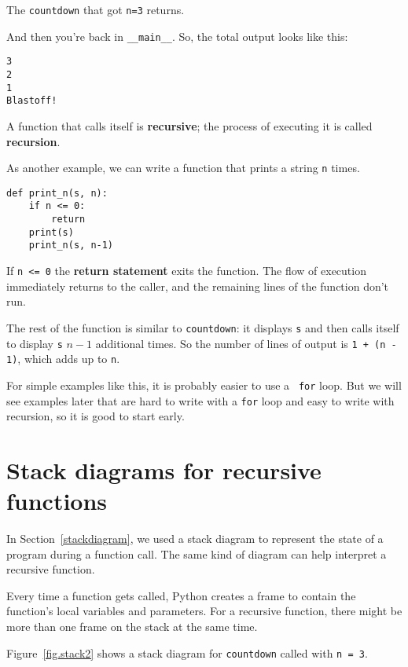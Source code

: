 The {\tt countdown} that got {\tt n=3} returns.

And then you're back in \verb"__main__".  So, the
total output looks like this:

\begin{verbatim}
3
2
1
Blastoff!
\end{verbatim}
%
A function that calls itself is {\bf recursive}; the process of
executing it is called {\bf recursion}.

As another example, we can write a function that prints a
string {\tt n} times.

\begin{verbatim}
def print_n(s, n):
    if n <= 0:
        return
    print(s)
    print_n(s, n-1)
\end{verbatim}
%
If {\tt n <= 0} the {\bf return statement} exits the function.  The
flow of execution immediately returns to the caller, and the remaining
lines of the function don't run.

The rest of the function is similar to {\tt countdown}: it displays
{\tt s} and then calls itself to display {\tt s} $n-1$ additional
times.  So the number of lines of output is {\tt 1 + (n - 1)}, which
adds up to {\tt n}.

For simple examples like this, it is probably easier to use a {\tt
for} loop.  But we will see examples later that are hard to write
with a {\tt for} loop and easy to write with recursion, so it is
good to start early.


\section{Stack diagrams for recursive functions}
\label{recursive.stack}

In Section~\ref{stackdiagram}, we used a stack diagram to represent
the state of a program during a function call.  The same kind of
diagram can help interpret a recursive function.

Every time a function gets called, Python creates a
frame to contain the function's local variables and parameters.
For a recursive function, there might be more than one frame on the
stack at the same time.

Figure~\ref{fig.stack2} shows a stack diagram for {\tt countdown} called with
{\tt n = 3}.

